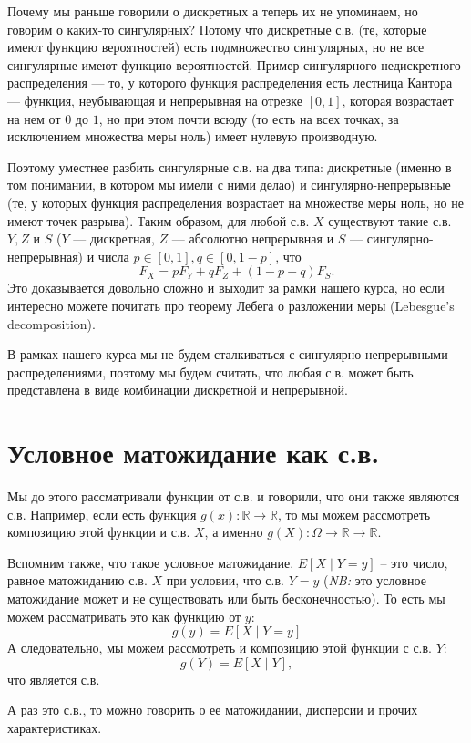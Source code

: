 \documentclass[12pt]{article}
\newcommand\R{\mathbb{R}}
\begin{document}
Почему мы раньше говорили о дискретных а теперь их не упоминаем, но говорим о каких-то сингулярных? Потому что дискретные с.в. (те, которые имеют функцию вероятностей) есть подмножество сингулярных, но не все сингулярные имеют функцию вероятностей. Пример сингулярного недискретного распределения --- то, у которого функция распределения есть лестница Кантора --- функция, неубывающая и непрерывная на отрезке $[0, 1]$, которая возрастает на нем от $0$ до $1$, но при этом почти всюду (то есть на всех точках, за исключением множества меры ноль) имеет нулевую производную.

Поэтому уместнее разбить сингулярные с.в. на два типа: дискретные (именно в том понимании, в котором мы имели с ними делао) и сингулярно-непрерывные (те, у которых функция распределения возрастает на множестве меры ноль, но не имеют точек разрыва). Таким образом, для любой с.в. $X$ существуют такие с.в. $Y, Z$ и $S$ ($Y$ --- дискретная, $Z$ --- абсолютно непрерывная и $S$ --- сингулярно-непрерывная) и числа $p \in [0, 1], q \in [0, 1 - p]$, что 
\[
  F_X = pF_Y + qF_Z + (1 - p - q)F_S.
\]
Это доказывается довольно сложно и выходит за рамки нашего курса, но если интересно можете почитать про теорему Лебега о разложении меры (Lebesgue's decomposition).

В рамках нашего курса мы не будем сталкиваться с сингулярно-непрерывными распределениями, поэтому мы будем считать, что любая с.в. может быть представлена в виде комбинации дискретной и непрерывной. 

\section{Условное матожидание как с.в.}

Мы до этого рассматривали функции от с.в. и говорили, что они также являются с.в. Например, если есть функция $g(x): \R \to \R$, то мы можем рассмотреть композицию этой функции и с.в. $X$, а именно $g(X): \Omega \to \R \to \R$. 

Вспомним также, что такое условное матожидание. $E[X \mid Y = y]$ -- это число, равное матожиданию с.в. $X$ при условии, что с.в. $Y = y$ (\emph{NB:} это условное матожидание может и не существовать или быть бесконечностью). То есть мы можем рассматривать это как функцию от $y$:
\[
  g(y) = E[X \mid Y = y]
\]
А следовательно, мы можем рассмотреть и композицию этой функции с с.в. $Y$:
\[
  g(Y) = E[X \mid Y],
\]
что является с.в.

А раз это с.в., то можно говорить о ее матожидании, дисперсии и прочих характеристиках.
\end{document}
